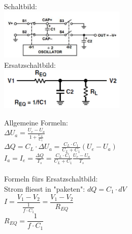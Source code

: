 	\begin{minipage}{250pt}
		Schaltbild:\\
		\includegraphics[width=6cm]{./images/schaltregler/07_chargepump}\\
		Ersatzschaltbild:\\
		\includegraphics[width=6cm]{./images/schaltregler/08_lr_ersatzsb}
	\end{minipage}
	\begin{minipage}{250pt}
	Allgemeine Formeln:\\
			$\Delta U_a  = \frac{U_e - U_a}{1 + \frac{C_L}{C_1}} $\\
			$\Delta Q = C_L \cdot \Delta U_a = \frac{C_L \cdot C_1}{C_L + C_1} (U_e - U_a)$ \\
			$I_a = I_e = \frac{\Delta Q}{T_s} = \frac{C_L \cdot C_1}{C_L + C_1} \frac{U_e - U_a}{T_s}$\\\\
			
	Formeln fürs Ersatzschaltbild:\\
			Strom fliesst in "paketen": $dQ = C_1 \cdot dV$\\
			$I = \dfrac{V_1-V_2}{\frac{1}{f\cdot C_1}} = \dfrac{V_1-V_2}{R_{EQ}}$\\
			$R_{EQ} = \dfrac{1}{f\cdot C_1}$\\
			
	\end{minipage}\\
	

	